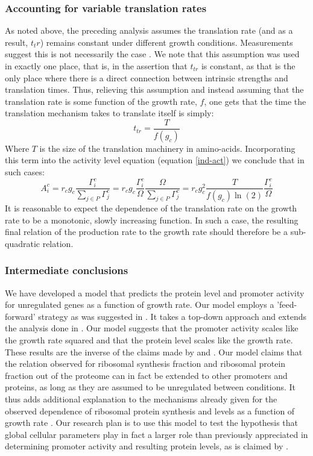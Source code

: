 \documentclass[a4page,notitlepage]{article}
\begin{document}
\subsubsection{Accounting for variable translation rates}
As noted above, the preceding analysis assumes the translation rate (and as a result, $t_tr$) remains constant under different growth conditions.
Measurements suggest this is not necessarily the case \cite{Liang2000}.
We note that this assumption was used in exactly one place, that is, in the assertion that $t_{tr}$ is constant, as that is the only place where there is a direct connection between intrinsic strengths and translation times.
Thus, relieving this assumption and instead assuming that the translation rate is some function of the growth rate, $f$, one gets that the time the translation mechanism takes to translate itself is simply:
\begin{equation}
t_{tr}=\frac{T}{f(g_c)}
\end{equation}
Where $T$ is the size of the translation machinery in amino-acids.
Incorporating this term into the activity level equation (equation \ref{ind-act}) we conclude that in such cases:
\begin{equation}
A^c_i=r_c g_c \frac{\Gamma^c_i}{\sum_{j\in P}\Gamma^c_j}=r_c g_c \frac{\Gamma^c_i}{\Omega}\frac{\Omega}{\sum_{j\in P}\Gamma^c_j}=r_c g_c^2\frac{T}{f(g_c)\ln(2)}\frac{\Gamma^c_i}{\Omega}
\end{equation}
It is reasonable to expect the dependence of the translation rate on the growth rate to be a monotonic, slowly increasing function.
In such a case, the resulting final relation of the production rate to the growth rate should therefore be a sub-quadratic relation.
\subsubsection{Intermediate conclusions}
We have developed a model that predicts the protein level and promoter activity for unregulated genes as a function of growth rate.
Our model employs a 'feed-forward' strategy as was suggested in \cite{Levy2009}.
It takes a top-down approach and extends the analysis done in \cite{Leeat2013}.
Our model suggests that the promoter activity scales like the growth rate squared and that the protein level scales like the growth rate.
These results are the inverse of the claims made by \cite{Klumpp2009a} and \cite{Scott2010b}.
Our model claims that the relation observed for ribosomal synthesis fraction \cite{Zaslaver2009a} and ribosomal protein fraction \cite{Maaloe1969,ingraham1983growth} out of the proteome can in fact be extended to other promoters and proteins, as long as they are assumed to be unregulated between conditions.
It thus adds additional explanation to the mechanisms already given for the observed dependence of ribosomal protein synthesis and levels as a function of growth rate \cite{Zaslaver2009a}.
Our research plan is to use this model to test the hypothesis that global cellular parameters play in fact a larger role than previously appreciated in determining promoter activity and resulting protein levels, as is claimed by \cite{Berthoumieux2013}.
\end{document}
